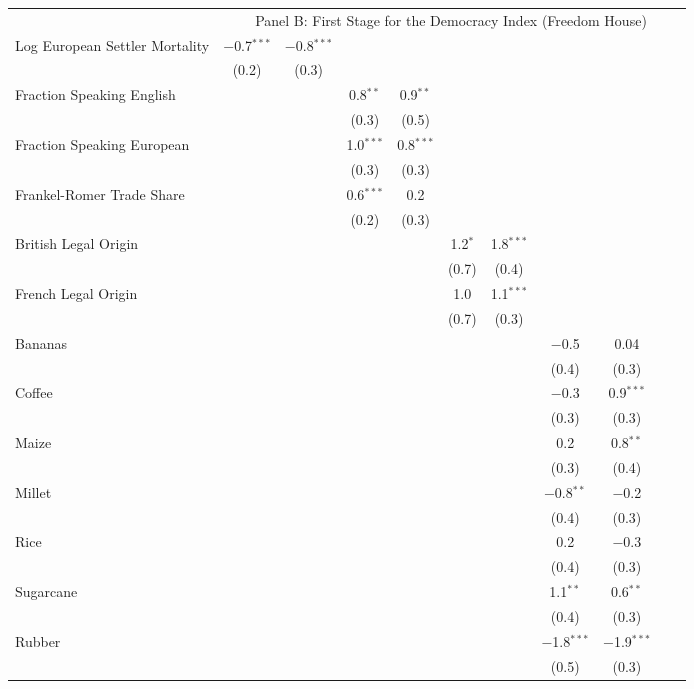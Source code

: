 \begin{table}[!htbp]
\begin{threeparttable}
\begin{tabular}{@{\extracolsep{0pt}}lcccccccccc}
   & \multicolumn{10}{c}{Panel B: First Stage for the Democracy Index (Freedom House)} \\
  Log European Settler Mortality & $-$0.7$^{***}$ & $-$0.8$^{***}$ &  &  &  &  &  &  &  &  \\ 
  & (0.2) & (0.3) &  &  &  &  &  &  &  &  \\ 
  Fraction Speaking English &  &  & 0.8$^{**}$ & 0.9$^{**}$ &  &  &  &  &  &  \\ 
  &  &  & (0.3) & (0.5) &  &  &  &  &  &  \\ 
  Fraction Speaking European &  &  & 1.0$^{***}$ & 0.8$^{***}$ &  &  &  &  &  &  \\ 
  &  &  & (0.3) & (0.3) &  &  &  &  &  &  \\ 
  Frankel-Romer Trade Share &  &  & 0.6$^{***}$ & 0.2 &  &  &  &  &  &  \\ 
  &  &  & (0.2) & (0.3) &  &  &  &  &  &  \\ 
  British Legal Origin &  &  &  &  & 1.2$^{*}$ & 1.8$^{***}$ &  &  &  &  \\ 
  &  &  &  &  & (0.7) & (0.4) &  &  &  &  \\ 
  French Legal Origin &  &  &  &  & 1.0 & 1.1$^{***}$ &  &  &  &  \\ 
  &  &  &  &  & (0.7) & (0.3) &  &  &  &  \\ 
  Bananas &  &  &  &  &  &  & $-$0.5 & 0.04 &  &  \\ 
  &  &  &  &  &  &  & (0.4) & (0.3) &  &  \\ 
  Coffee &  &  &  &  &  &  & $-$0.3 & 0.9$^{***}$ &  &  \\ 
  &  &  &  &  &  &  & (0.3) & (0.3) &  &  \\ 
  Maize &  &  &  &  &  &  & 0.2 & 0.8$^{**}$ &  &  \\ 
  &  &  &  &  &  &  & (0.3) & (0.4) &  &  \\ 
  Millet &  &  &  &  &  &  & $-$0.8$^{**}$ & $-$0.2 &  &  \\ 
  &  &  &  &  &  &  & (0.4) & (0.3) &  &  \\ 
  Rice &  &  &  &  &  &  & 0.2 & $-$0.3 &  &  \\ 
  &  &  &  &  &  &  & (0.4) & (0.3) &  &  \\ 
  Sugarcane &  &  &  &  &  &  & 1.1$^{**}$ & 0.6$^{**}$ &  &  \\ 
  &  &  &  &  &  &  & (0.4) & (0.3) &  &  \\ 
  Rubber &  &  &  &  &  &  & $-$1.8$^{***}$ & $-$1.9$^{***}$ &  &  \\ 
  &  &  &  &  &  &  & (0.5) & (0.3) &  &  \\ 

\end{tabular}
\end{threeparttable}
\end{table}
